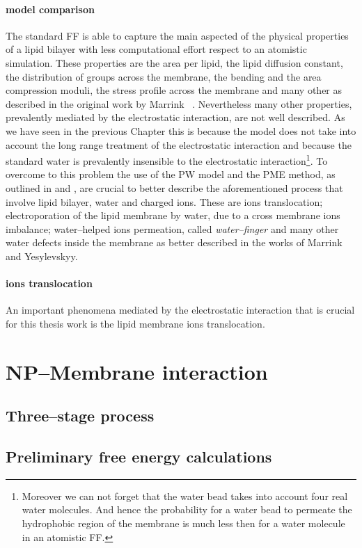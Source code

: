 \paragraph{\textbf{model comparison}} The standard \martini \ac{FF} is able to capture the main aspected of the physical properties of a lipid bilayer with less computational effort respect to an atomistic simulation. These properties are the area per lipid, the lipid diffusion constant, the distribution of groups across the membrane, the bending and the area compression moduli, the stress profile across the membrane and many other as described in the original work by Marrink \etal\, \cite{Martini}. Nevertheless many other properties, prevalently mediated by the electrostatic interaction, are not well described. As we have seen in the previous Chapter this is because the \martini model does not take into account the long range treatment of the electrostatic interaction and because the standard \martini water is prevalently insensible to the electrostatic interaction\footnote{Moreover we can not forget that the \martini water bead takes into account four real water molecules. And hence the probability for a \martini water bead to permeate the hydrophobic region of the membrane is much less then for a water molecule in an atomistic \ac{FF}.}. To overcome to this problem the use of the \ac{PW} model and the \ac{PME} method, as outlined in \cite{MartiniReview} and \cite{PW}, are crucial to better describe the aforementioned process that involve lipid bilayer, water and charged ions. These are ions translocation; electroporation of the lipid membrane by water, due to a cross membrane ions imbalance; water--helped ions permeation, called \textit{water--finger} and many other water defects inside the membrane as better described in the works of Marrink and Yesylevskyy.

\paragraph{\textbf{ions translocation}} An important phenomena mediated by the electrostatic interaction that is crucial for this thesis work is the lipid membrane ions translocation. 

\section{NP--Membrane interaction}

\subsection{Three--stage process}

\subsection{Preliminary free energy calculations}






